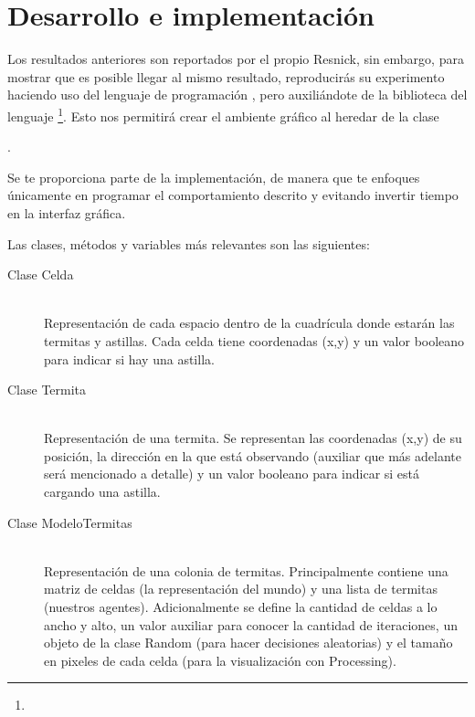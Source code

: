 \section{Desarrollo e implementaci\'on}


Los resultados anteriores son reportados por el propio Resnick, sin embargo, para mostrar que es posible llegar al mismo resultado, reproducirás su experimento haciendo uso del lenguaje de programación \Java, pero auxiliándote de la biblioteca  del lenguaje \footnote{}.  Esto nos permitirá crear el ambiente gráfico al heredar de la clase
\begin{center}
 .
\end{center}

Se te proporciona parte de la implementación, de manera que te enfoques únicamente en programar el comportamiento descrito y evitando invertir tiempo en la interfaz gráfica.

Las clases, métodos y variables más relevantes son las siguientes:

\begin{description}%
  \item[Clase Celda] \hfill \\
    Representación de cada espacio dentro de la cuadrícula donde estarán las termitas y astillas.
    Cada celda tiene coordenadas (x,y) y un valor booleano para indicar si hay una astilla.

  \item[Clase Termita] \hfill \\
    Representación de una termita. Se representan las coordenadas (x,y) de su posición, la dirección en la que está observando (auxiliar que más adelante será mencionado a detalle) y un valor booleano para indicar si está cargando una astilla.

  \item[Clase ModeloTermitas] \hfill \\
    Representación de una colonia de termitas. Principalmente contiene una matriz de celdas (la representación del mundo) y una lista de termitas (nuestros agentes). Adicionalmente se define la cantidad de celdas a lo ancho y alto, un valor auxiliar para conocer la cantidad de iteraciones, un objeto de la clase Random (para hacer decisiones aleatorias) y el tamaño en pixeles de cada celda (para la visualización con Processing).
\end{description}

